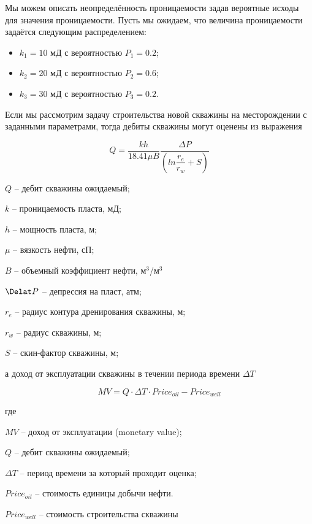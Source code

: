 Мы  можем описать неопределённость проницаемости задав вероятные исходы для значения проницаемости. Пусть мы ожидаем, что величина проницаемости задаётся следующим распределением:

\begin{itemize}
	\item $k_1 = 10$ мД с вероятностью $P_1 = 0.2$; 
	\item $k_2 = 20$ мД с вероятностью $P_2 = 0.6$; 
	\item $k_3 = 30$ мД с вероятностью $P_3 = 0.2$. 
\end{itemize}

Если мы рассмотрим задачу строительства новой скважины на месторождении с заданными параметрами, тогда дебиты скважины могут оценены из выражения

\begin{equation}
	Q = \frac{kh}{18.41 \mu B} \frac{\Delta P}{  \left( ln\dfrac{r_e}{r_w} + S\right) }
	\label{eq:eq_q}
\end{equation}

$Q$ -- дебит скважины ожидаемый;

$k$ -- проницаемость пласта, мД;

$h$ -- мощность пласта, м;

$\mu$ -- вязкость нефти, сП;

$B$ -- объемный коэффициент нефти, м$^3$/м$^3$

$\Delat P$ -- депрессия на пласт, атм;

$r_e$ -- радиус контура дренирования скважины, м;

$r_w$ -- радиус скважины, м;

$S$ -- скин-фактор скважины, м;


а доход от эксплуатации скважины в течении периода времени  $\Delta T$

\begin{equation}
	MV = Q \cdot  \Delta T \cdot  Price_{oil} - Price_{well}
	\label{eq:eq_MV}
\end{equation}

где 

$MV$ -- доход от эксплуатации (monetary value);

$Q$ -- дебит скважины ожидаемый;
 
$\Delta T$ -- период времени за который проходит оценка;

$Price_{oil}$ -- стоимость единицы добычи нефти.

$Price_{well}$ -- стоимость строительства скважины

